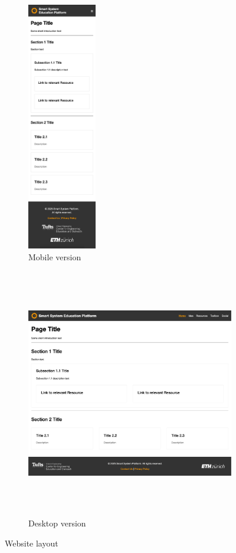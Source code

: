 \begin{figure}[H]
    \centering
    \begin{subfigure}{.18\textwidth}
        \includegraphics[height=310pt]{overleaf/images/website_mobile.png}
        \caption{Mobile version}
    \end{subfigure}
    \begin{subfigure}{.81\textwidth}
        \includegraphics[height=310pt]{overleaf/images/website_desktop.png}
        \caption{Desktop version}
    \end{subfigure}
    \vspace{.3\ftspace}
    \caption{Website layout}
    \label{fig:website_layout}
\end{figure}

